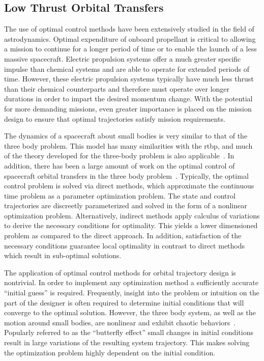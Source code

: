 \subsection{Low Thrust Orbital Transfers}

The use of optimal control methods have been extensively studied in the field of astrodynamics.
Optimal expenditure of onboard propellant is critical to allowing a mission to continue for a longer period of time or to enable the launch of a less massive spacecraft.
Electric propulsion systems offer a much greater specific impulse than chemical systems and are able to operate for extended periods of time.
However, these electric propulsion systems typically have much less thrust than their chemical counterparts and therefore must operate over longer durations in order to impart the desired momentum change.
With the potential for more demanding missions, even greater importance is placed on the mission design to ensure that optimal trajectories satisfy mission requirements. 

The dynamics of a spacecraft about small bodies is very similar to that of the three body problem.
This model has many similarities with the \gls{rtbp}, and much of the theory developed for the three-body problem is also applicable~\cite{mondelo2010,herrera2014}.
In addition, there has been a large amount of work on the optimal control of spacecraft orbital transfers in the three body problem~\cite{mingotti2011,grebow2011}.
Typically, the optimal control problem is solved via direct methods, which approximate the continuous time problem as a parameter optimization problem.
The state and control trajectories are discreetly parameterized and solved in the form of a nonlinear optimization problem.
Alternatively, indirect methods apply calculus of variations to derive the necessary conditions for optimality. 
This yields a lower dimensioned problem as compared to the direct approach.
In addition, satisfaction of the necessary conditions guarantee local optimality in contrast to direct methods which result in sub-optimal solutions.

The application of optimal control methods for orbital trajectory design is nontrivial.
In order to implement any optimization method a sufficiently accurate ``initial guess'' is required.
Frequently, insight into the problem or intuition on the part of the designer is often required to determine initial conditions that will converge to the optimal solution.
However, the three body system, as well as the motion around small bodies, are nonlinear and exhibit chaotic behaviors~\cite{scheeres2012a,szebehely1967}.
Popularly referred to as the ``butterfly effect'' small changes in initial conditions result in large variations of the resulting system trajectory. 
This makes solving the optimization problem highly dependent on the initial condition.

